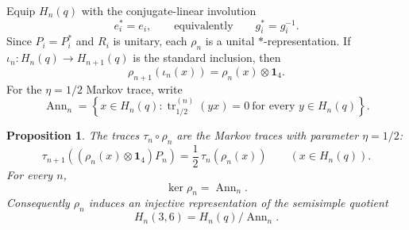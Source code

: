 \documentclass[11pt]{article}
\newtheorem{proposition}[theorem]{Proposition}
\theoremstyle{remark}
\newcommand{\Id}{\mathbf 1}
\begin{document}
Equip \(H_n(q)\) with the conjugate-linear involution
\[
  e_i^*=e_i,\qquad\text{equivalently}\qquad g_i^*=g_i^{-1}.
\]
Since \(P_i=P_i^*\) and \(R_i\) is unitary, each \(\rho_n\) is a unital
\(*\)-representation.  If
\(\iota_n:H_n(q)\to H_{n+1}(q)\) is the standard inclusion, then
\begin{equation}
  \rho_{n+1}(\iota_n(x))=\rho_n(x)\otimes\Id_4.
  \label{eq:tower-compatibility}
\end{equation}
For the \(\eta=1/2\) Markov trace, write
\[
  \operatorname{Ann}_n
  =
  \left\{x\in H_n(q):
  \operatorname{tr}^{(n)}_{1/2}(yx)=0\ \text{for every }y\in H_n(q)\right\}.
\]

\begin{proposition}\label{prop:markov}
The traces \(\tau_n\circ\rho_n\) are the Markov traces with parameter
\(\eta=1/2\):
\begin{equation}
  \tau_{n+1}\!\left((\rho_n(x)\otimes\Id_4)P_n\right)
  =\frac12\,\tau_n(\rho_n(x))
  \qquad(x\in H_n(q)).
  \label{eq:markov}
\end{equation}
For every \(n\),
\[
  \ker\rho_n=\operatorname{Ann}_n.
\]
Consequently \(\rho_n\)
induces an injective representation of the semisimple quotient
\[
  H_n(3,6)=H_n(q)/\operatorname{Ann}_n.
\]
\end{proposition}
\end{document}
